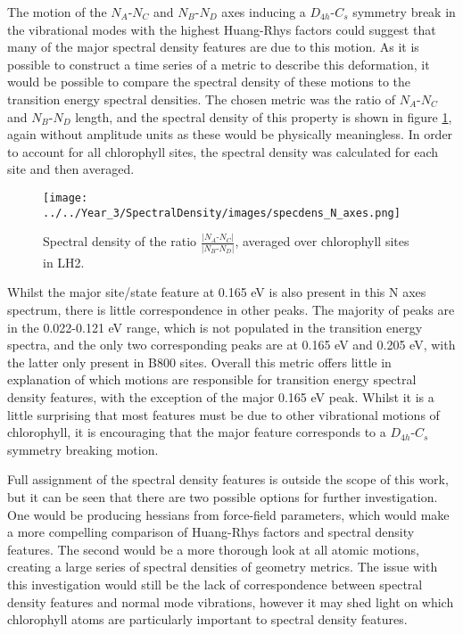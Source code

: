 The motion of the $N_A$-$N_C$ and $N_B$-$N_D$ axes inducing a $D_{4h}$-$C_{s}$ symmetry
break in the vibrational modes with the highest Huang-Rhys factors could suggest
that many of the major spectral density features are due to this motion. As it is
possible to construct a time series of a metric to describe this deformation, it
would be possible to compare the spectral density of these motions to the transition
energy spectral densities. The chosen metric was the ratio of $N_A$-$N_C$ and $N_B$-$N_D$
length, and the spectral density of this property is shown in figure \ref{fig:specdens_N_axes},
again without amplitude units as these would be physically meaningless. In order
to account for all chlorophyll sites, the spectral density was calculated for each
site and then averaged.

\begin{figure}
    \centering
    \texttt{[image: ../../Year\_3/SpectralDensity/images/specdens\_N\_axes.png]}
    \caption{Spectral density of the ratio $\frac{\left\lvert N_A\text{-}N_C \right\rvert}{\left\lvert N_B\text{-}N_D \right\rvert}$,
    averaged over chlorophyll sites in LH2.}
    \label{fig:specdens_N_axes}
\end{figure}

Whilst the major site/state feature at 0.165 eV is also present in this N axes spectrum,
there is little correspondence in other peaks. The majority of peaks are in the 
0.022-0.121 eV range, which is not populated in the transition energy spectra, and
the only two corresponding peaks are at 0.165 eV and 0.205 eV, with the latter only
present in B800 sites. Overall this metric offers little in explanation of which
motions are responsible for transition energy spectral density features, with the
exception of the major 0.165 eV peak. Whilst it is a little surprising that most 
features must be due to other vibrational motions of chlorophyll, it is encouraging 
that the major feature corresponds to a $D_{4h}$-$C_{s}$ symmetry breaking motion. 

Full assignment of the spectral density features is outside the scope of this work,
but it can be seen that there are two possible options for further investigation.
One would be producing hessians from force-field parameters, which would make a more
compelling comparison of Huang-Rhys factors and spectral density features. The second
would be a more thorough look at all atomic motions, creating a large series of 
spectral densities of geometry metrics. The issue with this investigation would 
still be the lack of correspondence between spectral density features and normal
mode vibrations, however it may shed light on which chlorophyll atoms are particularly
important to spectral density features.

